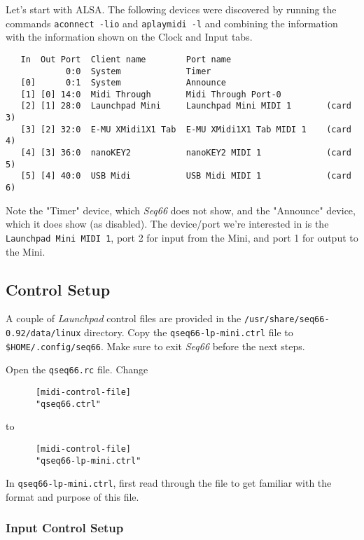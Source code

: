    Let's start with ALSA.  The following devices were discovered by running the
   commands \texttt{aconnect -lio} and \texttt{aplaymidi -l} and combining the
   information with the information shown on the Clock and Input tabs.

   \begin{verbatim}
   In  Out Port  Client name        Port name
            0:0  System             Timer
   [0]      0:1  System             Announce
   [1] [0] 14:0  Midi Through       Midi Through Port-0
   [2] [1] 28:0  Launchpad Mini     Launchpad Mini MIDI 1       (card 3)
   [3] [2] 32:0  E-MU XMidi1X1 Tab  E-MU XMidi1X1 Tab MIDI 1    (card 4)
   [4] [3] 36:0  nanoKEY2           nanoKEY2 MIDI 1             (card 5)
   [5] [4] 40:0  USB Midi           USB Midi MIDI 1             (card 6)
   \end{verbatim}

   Note the "Timer" device, which \textsl{Seq66} does not show, and the
   "Announce" device, which it does show (as disabled).  The device/port we're
   interested in is the \texttt{Launchpad Mini MIDI 1}, port 2 for input from the
   Mini, and port 1 for output to the Mini.

\subsection{Control Setup}
\label{subsec:launchpad_mini_control_setup}

   A couple of \textsl{Launchpad} control files are provided in the
   \texttt{/usr/share/seq66-0.92/data/linux} directory.
   Copy the \texttt{qseq66-lp-mini.ctrl} file to
   \texttt{\$HOME/.config/seq66}.
   Make sure to exit \textsl{Seq66} before the next steps.

   Open the \texttt{qseq66.rc} file.  Change

   \begin{verbatim}
      [midi-control-file]
      "qseq66.ctrl"
   \end{verbatim}

   to

   \begin{verbatim}
      [midi-control-file]
      "qseq66-lp-mini.ctrl"
   \end{verbatim}

   In \texttt{qseq66-lp-mini.ctrl}, first read through the file to get familiar
   with the format and purpose of this file.

\subsubsection{Input Control Setup}
\label{subsubsec:launchpad_mini_input_control_setup}

